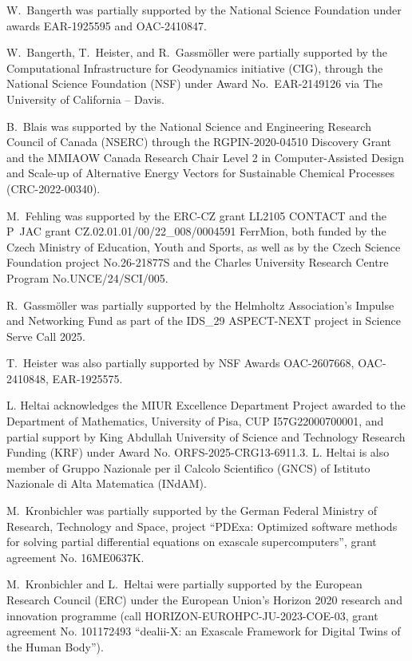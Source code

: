 \documentclass{ansarticle-preprint}
\begin{document}
W.~Bangerth was partially supported by the National Science Foundation
under awards EAR-1925595 and OAC-2410847.

W.~Bangerth, T.~Heister, and R.~Gassm\"{o}ller were partially
supported by the Computational Infrastructure for Geodynamics initiative
(CIG), through the National Science Foundation (NSF) under Award
No.~EAR-2149126 via The University of California -- Davis.

B.~Blais was supported by the National Science and Engineering Research
Council of Canada (NSERC) through the RGPIN-2020-04510 Discovery Grant
and the MMIAOW Canada Research Chair Level 2 in Computer-Assisted Design
and Scale-up of Alternative Energy Vectors for Sustainable Chemical Processes
(CRC-2022-00340).

M.~Fehling was supported by the ERC-CZ grant LL2105 CONTACT and
the P~JAC grant CZ.02.01.01/00/22\_008/0004591 FerrMion, both funded
by the Czech Ministry of Education, Youth and Sports, as well as by the
Czech Science Foundation project No.\@ 26-21877S and the Charles
University Research Centre Program No.\@ UNCE/24/SCI/005.

R.~Gassm\"{o}ller was partially supported by the Helmholtz Association's
Impulse and Networking Fund as part of the IDS\_29 ASPECT-NEXT project in Science Serve Call 2025.

T.~Heister was also partially supported by NSF Awards OAC-2607668, OAC-2410848, EAR-1925575.

L. Heltai acknowledges the MIUR Excellence Department Project awarded to the Department of Mathematics, University of Pisa, CUP I57G22000700001, and partial support by King Abdullah University of Science and Technology Research Funding (KRF) under Award No. ORFS-2025-CRG13-6911.3. L. Heltai is also member of Gruppo Nazionale per il Calcolo Scientifico (GNCS) of Istituto Nazionale di Alta Matematica (INdAM).

M.~Kronbichler was partially supported by the
German Federal Ministry of Research, Technology and Space, project
``PDExa: Optimized software methods for solving partial differential
equations on exascale supercomputers'', grant agreement No. 16ME0637K.

M.~Kronbichler and L.~Heltai were partially supported by the European Research
Council (ERC) under the European Union's Horizon 2020 research and innovation
programme (call HORIZON-EUROHPC-JU-2023-COE-03, grant agreement No. 101172493
``dealii-X: an Exascale Framework for Digital Twins of the Human Body'').
\end{document}
